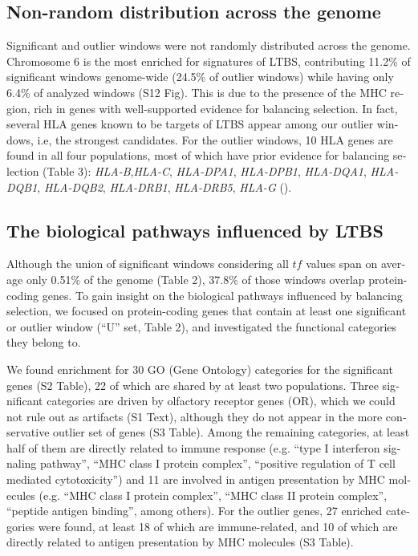 \begin{refsection}
\begin{otherlanguage}{english}
\subsection{Non-random distribution across the genome}
Significant and outlier windows were not randomly distributed across the genome. Chromosome 6 is the most enriched for signatures of LTBS, contributing 11.2\% of significant windows genome-wide (24.5\% of outlier windows) while having only 6.4\% of analyzed windows (S12 Fig). This is due to the presence of the MHC region, rich in genes with well-supported evidence for balancing selection. In fact, several HLA genes known to be targets of LTBS appear among our outlier windows, i.e, the strongest candidates. For the outlier windows, 10 HLA genes are found in all four populations, most of which have prior evidence for balancing selection (Table 3): \emph{HLA-B},\emph{HLA-C}, \emph{HLA-DPA1}, \emph{HLA-DPB1}, \emph{HLA-DQA1}, \emph{HLA-DQB1}, \emph{HLA-DQB2}, \emph{HLA-DRB1}, \emph{HLA-DRB5}, \emph{HLA-G} (\cite{DeGiorgio2014,Liu2006,Meyer2006,Sanchez-Mazas2007,Solberg2008,Tan2005}).

\subsection{The biological pathways influenced by LTBS}

Although the union of significant windows considering all $tf$ values span on average only 0.51\% of the genome (Table 2), 37.8\% of those windows overlap protein-coding genes. To gain insight on the biological pathways influenced by balancing selection, we focused on protein-coding
genes that contain at least one significant or outlier window (“U” set, Table 2), and investigated the functional categories they belong to.

We found enrichment for 30 GO (Gene Ontology) categories for the significant genes (S2 Table), 22 of which are shared by at least two populations. Three significant categories are driven by olfactory receptor genes (OR), which we could not rule out as artifacts (S1 Text), although they do not appear in the more conservative outlier set of genes (S3 Table). Among the remaining categories, at least half of them are directly related to immune response (e.g.
“type I interferon signaling pathway”, “MHC class I protein complex”, “positive regulation of T cell mediated cytotoxicity”) and 11 are involved in antigen presentation by MHC molecules (e.g. “MHC class I protein complex”, “MHC class II protein complex”, “peptide antigen binding”, among others). For the outlier genes, 27 enriched categories were found, at least 18 of which are immune-related, and 10 of which are directly related to antigen presentation by MHC molecules (S3 Table).


\end{otherlanguage}
\end{refsection}
